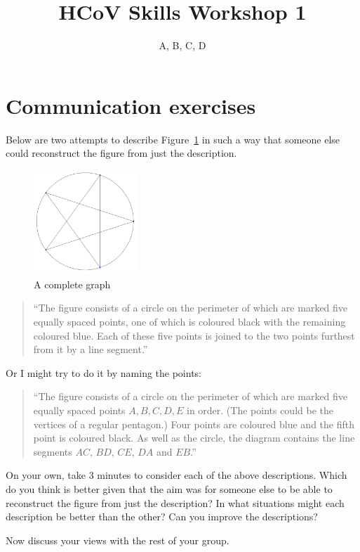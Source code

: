 \documentclass{UoESoMworkshop}
\title{HCoV Skills Workshop 1}
\author{A, B, C, D}
\begin{document}
\maketitle

\section{Communication exercises}

Below are two attempts to describe Figure~\ref{fig:completeGraph} in such a way that someone else could reconstruct the figure from just the description.

\begin{figure}[h]
    \centering
    \includegraphics[width=0.35\textwidth]{d9}
    \caption{A complete graph}
    \label{fig:completeGraph}
\end{figure}

\begin{quote}
``The figure consists of a circle on the perimeter of which 
are marked five equally spaced points, one of which is coloured black with the remaining coloured blue. 
Each of these five points is joined to the two points furthest from it by a line segment.''
\end{quote} 

\noindent Or I might try to do it by naming the points: 
\begin{quote}
``The figure consists of a circle on the perimeter of which are marked five equally spaced points $A,B,C,D,E$ in order. 
(The points could be the vertices of a regular pentagon.) Four points are coloured blue and the fifth point is coloured black.
As well as the circle, the diagram contains the line segments $AC$, $BD$, $CE$, $DA$ and $EB$.''
\end{quote} 


\begin{exercise}[10 min]
On your own, take 3 minutes to consider each of the above descriptions. Which do you think is better given that the aim was for someone else to be able to reconstruct the figure from just the description? In what situations might each description be better than the other? Can you improve the descriptions?

Now discuss your views with the rest of your group.
\end{exercise}
\end{document}
